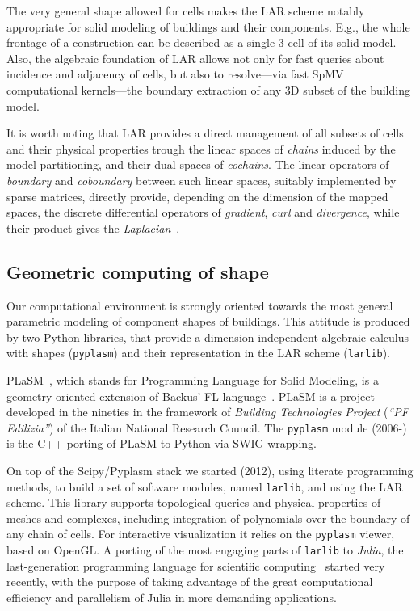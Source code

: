 \documentclass[a4paper,twoside]{article}
\begin{document}
The very general shape allowed for cells makes the LAR scheme notably appropriate for solid modeling of buildings and their components. E.g., the whole frontage of a construction can be described as a single 3-cell of its solid model. Also, the algebraic foundation of LAR allows not only for fast queries about incidence and adjacency of cells, but also to resolve---via fast SpMV computational kernels---the boundary extraction of any 3D subset of the building model. 

It is worth noting that LAR provides a direct management of all subsets of cells and their physical properties trough the linear spaces of \emph{chains} induced by the model partitioning, and their dual spaces of \emph{cochains}. The linear operators of \emph{boundary} and \emph{coboundary} between such linear spaces, suitably implemented by sparse matrices, directly provide, depending on the dimension of the mapped spaces, the discrete differential operators of \emph{gradient}, \emph{curl} and \emph{divergence}, while their product gives the \emph{Laplacian}~\cite{ieee-tase}.  

\subsection{Geometric computing of shape}

\noindent
Our computational environment is strongly oriented towards the most general parametric modeling of component shapes of buildings. This attitude is produced by two Python libraries, that provide a dimension-independent algebraic calculus with shapes (\texttt{pyplasm}) and their representation in the LAR scheme (\texttt{larlib}). 

PLaSM~\cite{Paoluzzi:1995:GPP:212332.212349,Paoluzzi:2001:GPC:600092}, which stands for Programming Language for Solid Modeling, is a geometry-oriented extension of Backus' FL language~\cite{backus:78,BWWLA89}.  PLaSM is a project developed in the nineties in the framework of \emph{Building Technologies Project} (\emph{``PF Edilizia''}) of the Italian National Research Council. The \texttt{pyplasm} module (2006-) is the C++ porting of PLaSM to Python via SWIG wrapping.

On top of the Scipy/Pyplasm stack we started (2012), using literate programming methods, to build a set of software modules, named \texttt{larlib}, and using the LAR scheme. This library supports  topological queries and physical properties of meshes and complexes, including integration of polynomials over the boundary of any chain of cells. For interactive visualization it relies on the \texttt{pyplasm} viewer, based on OpenGL.
A porting of the most engaging parts of \texttt{larlib} to \emph{Julia}, the last-generation programming language  for scientific computing~\cite{BEKS14} started very recently, with the purpose of taking advantage of the great computational efficiency and parallelism of Julia in more demanding applications. 
\end{document}
